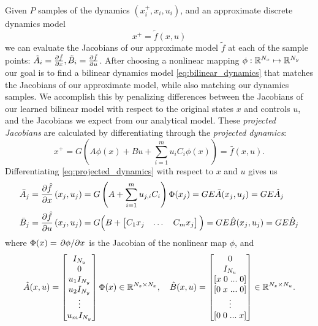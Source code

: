\documentclass{article}
\begin{document}
Given $P$ samples of the dynamics $(x_i^+, x_i, u_i)$, and an approximate discrete
dynamics model 
\begin{equation}
  x^+ = \tilde{f}(x,u)
\end{equation}
we can evaluate the Jacobians of our approximate model $\tilde{f}$ at each of the sample
points: $\tilde{A}_i = \pdv{\tilde{f}}{x}, \tilde{B}_i = \pdv{\tilde{f}}{u}$. After
choosing a nonlinear mapping $\phi : \mathbb{R}^{N_x} \mapsto \mathbb{R}^{N_y}$ our goal is to find a
bilinear dynamics model \eqref{eq:bilinear_dynamics} that matches the Jacobians of our
approximate model, while also matching our dynamics samples. We accomplish this by 
penalizing differences between the Jacobians of our learned bilinear model with respect to 
the original states $x$ and controls $u$, and the Jacobians we expect from our analytical 
model. These \textit{projected Jacobians} are calculated by differentiating through the 
\textit{projected dynamics}:
\begin{equation} \label{eq:projected_dynamics}
  x^+ = G \left( A \phi(x) + B u + \sum_{i=1}^m u_i C_i \phi(x) \right)  = \bar{f}(x,u).
\end{equation}
Differentiating \eqref{eq:projected_dynamics} with respect to $x$ and $u$ gives us
\begin{subequations} \label{eq:projected_jacobians}
  \begin{align}
    \bar{A}_j &= \pdv{\hat{f}}{x}\left(x_j,u_j\right) 
    = G \left(A + \sum_{i=1}^m u_{j,i} C_i \right) \Phi(x_j)
    = G E \bar{A}(x_j,u_j) = G E \hat{A}_j \\
    \bar{B}_j &= \pdv{\hat{f}}{u}\left(x_j,u_j\right) 
    = G \Big(B + \begin{bmatrix} C_1 x_j & \dots & C_m x_j \end{bmatrix} \Big)
    = G E \hat{B}(x_j,u_j) = G E \hat{B}_j
  \end{align}
\end{subequations}
where $\Phi(x) = \pdv*{\phi}{x}$ is the Jacobian of the nonlinear map $\phi$, and
\begin{equation}
  \hat{A}(x,u) =  \begin{bmatrix} 
    I_{N_y} \\ 0 \\ u_1 I_{N_y} \\ u_2 I_{N_y} \\ \vdots \\ u_m I_{N_y} 
  \end{bmatrix} \Phi(x) \in \mathbb{R}^{N_z \times N_x}, \quad
  \hat{B}(x,u) = \begin{bmatrix} 
    0 \\ 
    I_{N_u} \\ 
    [x \; 0 \; ... \; 0] \\
    [0 \; x \; ... \; 0] \\
    \vdots \\
    [0 \; 0 \; ... \; x] \\
  \end{bmatrix} \in \mathbb{R}^{N_z \times N_u}.
\end{equation}
\end{document}
